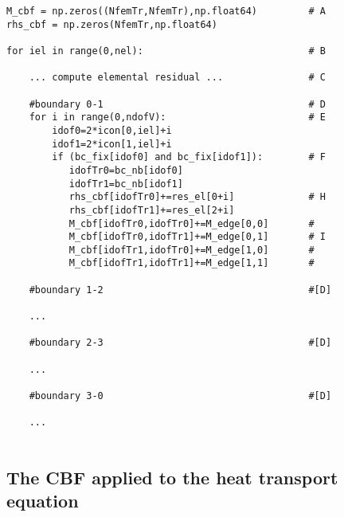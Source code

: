 \begin{lstlisting}
M_cbf = np.zeros((NfemTr,NfemTr),np.float64)         # A
rhs_cbf = np.zeros(NfemTr,np.float64)

for iel in range(0,nel):                             # B

    ... compute elemental residual ...               # C

    #boundary 0-1                                    # D
    for i in range(0,ndofV):                         # E
        idof0=2*icon[0,iel]+i
        idof1=2*icon[1,iel]+i
        if (bc_fix[idof0] and bc_fix[idof1]):        # F
           idofTr0=bc_nb[idof0]   
           idofTr1=bc_nb[idof1]
           rhs_cbf[idofTr0]+=res_el[0+i]             # H
           rhs_cbf[idofTr1]+=res_el[2+i]              
           M_cbf[idofTr0,idofTr0]+=M_edge[0,0]       # 
           M_cbf[idofTr0,idofTr1]+=M_edge[0,1]       # I
           M_cbf[idofTr1,idofTr0]+=M_edge[1,0]       # 
           M_cbf[idofTr1,idofTr1]+=M_edge[1,1]       #

    #boundary 1-2                                    #[D]

    ...

    #boundary 2-3                                    #[D]

    ...

    #boundary 3-0                                    #[D]

    ...


\end{lstlisting}










\subsection{The CBF applied to the heat transport equation}

